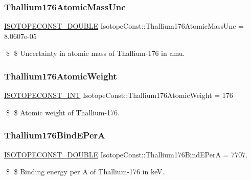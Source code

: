 \subsubsection{\texorpdfstring{Thallium176\+Atomic\+Mass\+Unc}{Thallium176AtomicMassUnc}}
{\footnotesize\ttfamily \mbox{\hyperlink{group___isotope_const-_macros_ga8f45a7272ce02c0b4c65c44636ed719a}{I\+S\+O\+T\+O\+P\+E\+C\+O\+N\+S\+T\+\_\+\+D\+O\+U\+B\+LE}} Isotope\+Const\+::\+Thallium176\+Atomic\+Mass\+Unc = 8.\+0607e-\/05}

\$ \$ Uncertainty in atomic mass of Thallium-\/176 in amu. \mbox{\label{group___isotope_const-_thallium-_tl176_ga8b8d54051ea6eb82b65fb6e3bf3fdbb9}} 
\subsubsection{\texorpdfstring{Thallium176\+Atomic\+Weight}{Thallium176AtomicWeight}}
{\footnotesize\ttfamily \mbox{\hyperlink{group___isotope_const-_macros_ga5f18360b3e99483a35c32d789e62621c}{I\+S\+O\+T\+O\+P\+E\+C\+O\+N\+S\+T\+\_\+\+I\+NT}} Isotope\+Const\+::\+Thallium176\+Atomic\+Weight = 176}

\$ \$ Atomic weight of Thallium-\/176. \mbox{\label{group___isotope_const-_thallium-_tl176_ga4641c731f59172790514b113dc628b25}} 
\subsubsection{\texorpdfstring{Thallium176\+Bind\+E\+PerA}{Thallium176BindEPerA}}
{\footnotesize\ttfamily \mbox{\hyperlink{group___isotope_const-_macros_ga8f45a7272ce02c0b4c65c44636ed719a}{I\+S\+O\+T\+O\+P\+E\+C\+O\+N\+S\+T\+\_\+\+D\+O\+U\+B\+LE}} Isotope\+Const\+::\+Thallium176\+Bind\+E\+PerA = 7707.}

\$ \$ Binding energy per A of Thallium-\/176 in keV. \mbox{\label{group___isotope_const-_thallium-_tl176_gac6d9759e86ee735cf7c77fe2d11eedfc}} 
